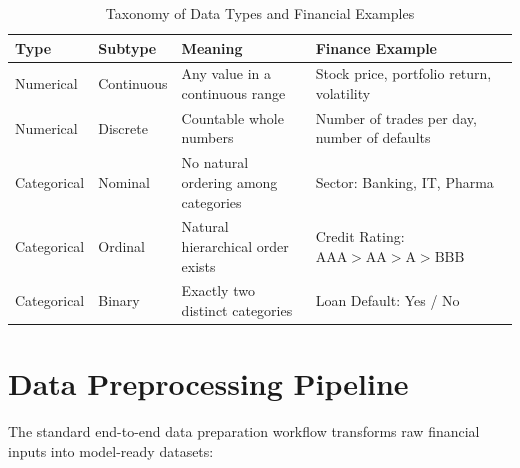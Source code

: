 \begin{table}[htbp]
\centering
\caption{Taxonomy of Data Types and Financial Examples}
\vspace{0.2em}
\begin{tabularx}{\textwidth}{llp{4.2cm}X}
\toprule
\textbf{Type} & \textbf{Subtype} & \textbf{Meaning} & \textbf{Finance Example} \\
\midrule
Numerical & Continuous & Any value in a continuous range & Stock price, portfolio return, volatility \\
\addlinespace[0.4em]
Numerical & Discrete & Countable whole numbers & Number of trades per day, number of defaults \\
\addlinespace[0.4em]
Categorical & Nominal & No natural ordering among categories & Sector: Banking, IT, Pharma \\
\addlinespace[0.4em]
Categorical & Ordinal & Natural hierarchical order exists & Credit Rating: $\text{AAA} > \text{AA} > \text{A} > \text{BBB}$ \\
\addlinespace[0.4em]
Categorical & Binary & Exactly two distinct categories & Loan Default: Yes / No \\
\bottomrule
\end{tabularx}
\end{table}

\section{Data Preprocessing Pipeline}

The standard end-to-end data preparation workflow transforms raw financial inputs into model-ready datasets:

